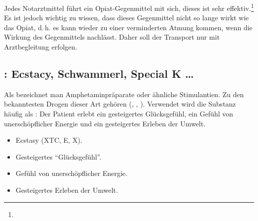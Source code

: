 {%
Jedes Notarztmittel führt ein Opiat-Gegenmittel mit sich,
dieses ist sehr effektiv.\footnote{} Es ist
jedoch wichtig zu wissen, dass dieses Gegenmittel nicht so
lange wirkt wie das Opiat, d.\,h. es kann wieder zu einer
verminderten Atmung kommen, wenn die Wirkung des
Gegenmittels nachlässt. Daher soll der Transport nur mit
Arztbegleitung erfolgen.

}{

}{}{}{}




\subsection{: Ecstacy, 
Schwammerl,
Special K \ldots}

\TextSlide{\TxBeschreibung}
{Als  bezeichnet man Amphetaminpräparate oder
ähnliche Stimulantien. Zu den bekanntesten Drogen dieser Art
gehören   (, , ). Verwendet wird
die Substanz häufig als : Der Patient erlebt
ein gesteigertes Glücksgefühl, ein Gefühl von
unerschöpflicher Energie und ein gesteigertes Erleben der
Umwelt.

}{
\begin{itemize}
  \item Ecstasy (XTC, E, X).
  \item Gesteigertes \enquote{Glücksgefühl}.
  \item Gefühl von unerschöpflicher Energie.
  \item Gesteigertes Erleben der Umwelt.
\end{itemize}
}{}{}{}

